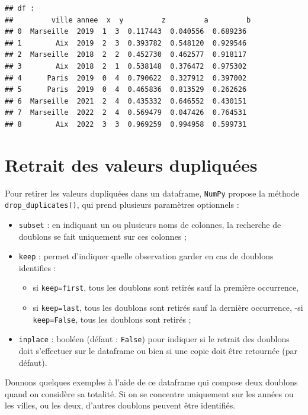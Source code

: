 \documentclass[
  12pt,
]{book}
\providecommand{\tightlist}{%
  \setlength{\itemsep}{0pt}\setlength{\parskip}{0pt}}
\numberwithin{equation}{section}
\numberwithin{countremarque}{section}
\begin{document}
\begin{lstlisting}
## df : 
##         ville annee  x  y         z         a         b
## 0  Marseille  2019  1  3  0.117443  0.040556  0.689236
## 1        Aix  2019  2  3  0.393782  0.548120  0.929546
## 2  Marseille  2018  2  2  0.452730  0.462577  0.918117
## 3        Aix  2018  2  1  0.538148  0.376472  0.975302
## 4      Paris  2019  0  4  0.790622  0.327912  0.397002
## 5      Paris  2019  0  4  0.465836  0.813529  0.262626
## 6  Marseille  2021  2  4  0.435332  0.646552  0.430151
## 7  Marseille  2022  2  4  0.569479  0.047426  0.764531
## 8        Aix  2022  3  3  0.969259  0.994958  0.599731
\end{lstlisting}

\section{Retrait des valeurs dupliquées}\label{retrait-des-valeurs-dupliquuxe9es}

Pour retirer les valeurs dupliquées dans un dataframe, \texttt{NumPy} propose la méthode \texttt{drop\_duplicates()}, qui prend plusieurs paramètres optionnels :

\begin{itemize}
\item
  \texttt{subset} : en indiquant un ou plusieurs noms de colonnes, la recherche de doublons se fait uniquement sur ces colonnes ;
\item
  \texttt{keep} : permet d'indiquer quelle observation garder en cas de doublons identifies :

  \begin{itemize}
  \tightlist
  \item
    si \texttt{keep=\textquotesingle{}first\textquotesingle{}}, tous les doublons sont retirés sauf la première occurrence,
  \item
    si \texttt{keep=\textquotesingle{}last\textquotesingle{}}, tous les doublons sont retirés sauf la dernière occurrence,
    -si \texttt{keep=\textquotesingle{}False\textquotesingle{}}, tous les doublons sont retirés ;
  \end{itemize}
\item
  \texttt{inplace} : booléen (défaut : \texttt{False}) pour indiquer si le retrait des doublons doit s'effectuer sur le dataframe ou bien si une copie doit être retournée (par défaut).
\end{itemize}

Donnons quelques exemples à l'aide de ce dataframe qui compose deux doublons quand on considère sa totalité. Si on se concentre uniquement sur les années ou les villes, ou les deux, d'autres doublons peuvent être identifiés.
\end{document}
